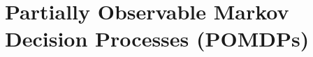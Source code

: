 \documentclass[../Main.tex]{subfiles}
\begin{document}






% 
\section{Partially Observable Markov Decision Processes (POMDPs)}
\end{document}
